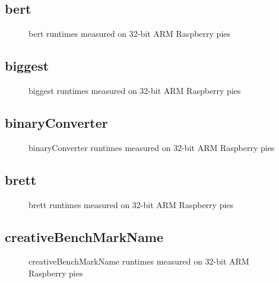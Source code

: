 \newpage
\subsection{bert}
    
    \begin{figure}[h]
	    \centering
		
        \caption{bert runtimes measured on 32-bit ARM Raspberry pies}
	\end{figure}
    


\newpage
\subsection{biggest}
    
    \begin{figure}[h]
	    \centering
		
        \caption{biggest runtimes measured on 32-bit ARM Raspberry pies}
	\end{figure}
    


\newpage
\subsection{binaryConverter}
    
    \begin{figure}[h]
	    \centering
		
        \caption{binaryConverter runtimes measured on 32-bit ARM Raspberry pies}
	\end{figure}
    


\newpage
\subsection{brett}
    
    \begin{figure}[h]
	    \centering
		
        \caption{brett runtimes measured on 32-bit ARM Raspberry pies}
	\end{figure}
    


\newpage
\subsection{creativeBenchMarkName}
    
    \begin{figure}[h]
	    \centering
		
        \caption{creativeBenchMarkName runtimes measured on 32-bit ARM Raspberry pies}
	\end{figure}
    


